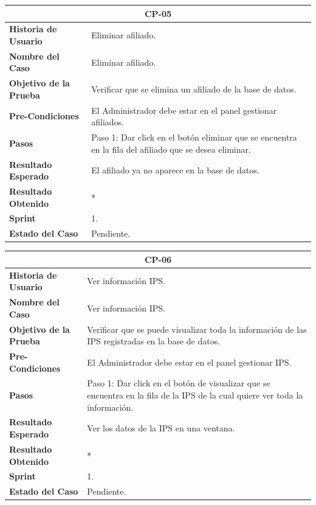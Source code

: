 \documentclass[12pt,a4paper]{article}
\begin{document}
\begin{center}
\begin{tabular}{|m{5cm}|m{9cm}|}
\hline
\multicolumn{2}{|c|}{\textbf{CP-05}} \\
\hline
\textbf{Historia de Usuario} & Eliminar afiliado. \\
\hline
\textbf{Nombre del Caso} & Eliminar afiliado. \\
\hline
\textbf{Objetivo de la Prueba} & Verificar que se elimina un afiliado de la base de datos. \\
\hline
\textbf{Pre-Condiciones} & El Administrador debe estar en el panel gestionar afiliados. \\
\hline
\textbf{Pasos} & Paso 1: Dar click en el botón eliminar que se encuentra en la fila del afiliado que se desea eliminar. \\
\hline
\textbf{Resultado Esperado} & El afiliado ya no aparece en la base de datos. \\
\hline
\textbf{Resultado Obtenido} & * \\
\hline
\textbf{Sprint} & 1. \\
\hline
\textbf{Estado del Caso} & Pendiente. \\
\hline
\end{tabular}
\vspace{5mm}

\begin{tabular}{|m{5cm}|m{9cm}|}
\hline
\multicolumn{2}{|c|}{\textbf{CP-06}} \\
\hline
\textbf{Historia de Usuario} & Ver información IPS. \\
\hline
\textbf{Nombre del Caso} & Ver información IPS. \\
\hline
\textbf{Objetivo de la Prueba} & Verificar que se puede visualizar toda la información de las IPS registradas en la base de datos. \\
\hline
\textbf{Pre-Condiciones} & El Administrador debe estar en el panel gestionar IPS. \\
\hline
\textbf{Pasos} & Paso 1: Dar click en el botón de visualizar que se encuentra en la fila de la IPS de la cual quiere ver toda la información. \\
\hline
\textbf{Resultado Esperado} &  Ver los datos de la IPS en una ventana.\\
\hline
\textbf{Resultado Obtenido} & * \\
\hline
\textbf{Sprint} & 1. \\
\hline
\textbf{Estado del Caso} & Pendiente. \\
\hline
\end{tabular}
\vspace{5mm}


\end{center}
\end{document}
